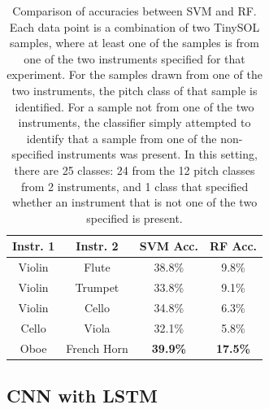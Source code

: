 \documentclass[runningheads,a4paper]{llncs}
\begin{document}

\begin{table}
  \centering
  \caption{Comparison of accuracies between SVM and RF. Each data point is a combination of two TinySOL samples, where at least one of the samples is from one of the two instruments specified for that experiment. For the samples drawn from one of the two instruments, the pitch class of that sample is identified. For a sample not from one of the two instruments, the classifier simply attempted to identify that a sample from one of the non-specified instruments was present. In this setting, there are 25 classes: 24 from the 12 pitch classes from 2 instruments, and 1 class that specified whether an instrument that is not one of the two specified is present. \label{tab:baselines}}
    \begin{tabular}{|c|c|c|c|}
    	  \hline
      \textbf{Instr. 1} & \textbf{Instr. 2} & \textbf{SVM Acc.} & \textbf{RF Acc.}\\
      \hline
      Violin & Flute & 38.8\% & 9.8\% \\
      \hline
      Violin & Trumpet & 33.8\% & 9.1\% \\
      \hline
      Violin & Cello & 34.8\% & 6.3\% \\
      \hline
      Cello & Viola & 32.1\% & 5.8\% \\
      \hline
      Oboe & French Horn & \textbf{39.9\%} & \textbf{17.5\%} \\
      \hline
    \end{tabular}
\end{table}


\subsection{CNN with LSTM}
\end{document}
